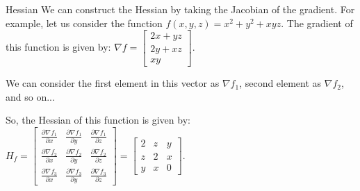 \documentclass[handout]{beamer}
\begin{document}
\begin{frame}{Hessian}
    We can construct the Hessian by taking the Jacobian of the gradient.
    For example, let us consider the function $f(x, y, z) = x^2 + y^2 + xyz$.
    The gradient of this function is given by: $\nabla f = \begin{bmatrix} 2x + yz \\ 2y + xz \\ xy\end{bmatrix}$.

    We can consider the first element in this vector as $\nabla f_1$, second element as $\nabla f_2$, and so on...

    So, the Hessian of this function is given by:
    $H_f = \begin{bmatrix} \frac{\partial \nabla f_1}{\partial x} & \frac{\partial \nabla f_1}{\partial y} & \frac{\partial \nabla f_1}{\partial z} \\
            \frac{\partial \nabla f_2}{\partial x} & \frac{\partial \nabla f_2}{\partial y} & \frac{\partial \nabla f_2}{\partial z} \\
            \frac{\partial \nabla f_3}{\partial x} & \frac{\partial \nabla f_3}{\partial y} & \frac{\partial \nabla f_3}{\partial z}\end{bmatrix}
        =\begin{bmatrix} 2 & z & y\\ z & 2 & x \\ y & x & 0\end{bmatrix}$.


\end{frame}
\end{document}
